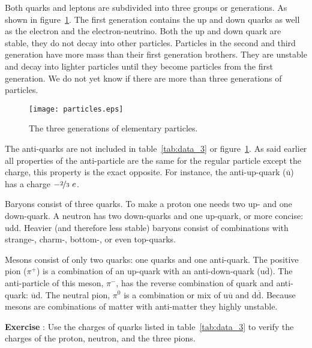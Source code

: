 \vspace{0.5cm}

Both quarks and leptons are subdivided into three groups or generations. As shown in figure~\ref{fig:particles}. The first generation contains the up and down quarks as well as the electron and the electron-neutrino. Both the up and down quark are stable, they do not decay into other particles. Particles in the second and third generation have more mass than their first generation brothers. They are unstable and decay into lighter particles until they become particles from the first generation. We do not yet know if there are more than three generations of particles.

\begin{figure}[h]\begin{center}
\texttt{[image: particles.eps]}%
\caption{The three generations of elementary particles.\protect\footnotemark}\label{fig:particles}
\end{center}\end{figure}

The anti-quarks are not included in table~\ref{tab:data_3} or figure~\ref{fig:particles}. As said earlier all properties of the anti-particle are the same for the regular particle except the charge, this property is the exact opposite. For instance, the anti-up-quark ($\overline{\mbox{u}}$) has a charge $-\nicefrac{2}{3}~e$.

Baryons consist of three quarks. To make a proton one needs two up- and one down-quark. A neutron has two down-quarks and one up-quark, or more concise: udd. Heavier (and therefore less stable) baryons consist of combinations with strange-, charm-, bottom-, or even top-quarks.

Mesons consist of only two quarks: one quarks and one anti-quark. The positive pion ($\pi^+$) is a combination of an up-quark with an anti-down-quark (u$\overline{\mbox{d}}$). The anti-particle of this meson, $\pi^-$, has the reverse combination of quark and anti-quark: $\overline{\mbox{u}}$d. The neutral pion, $\pi^0$ is a combination or mix of u$\overline{\mbox{u}}$ and d$\overline{\mbox{d}}$. Because mesons are combinations of matter with anti-matter they highly unstable. 

\begin{shaded}
\textbf{Exercise \theExercise {}} : Use the charges of quarks listed in table~\ref{tab:data_3} to verify the charges of the proton, neutron, and the three pions.\end{shaded}

